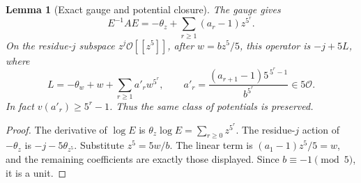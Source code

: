 \documentclass[11pt]{article}
\newtheorem{lemma}{Lemma}
\newcommand{\OO}{\mathcal O}
\begin{document}
\begin{lemma}[Exact gauge and potential closure]\label{lem:quintic-ah-gauge}
The gauge gives
\[
 E^{-1}AE=-\theta_z+\sum_{r\ge1}(a_r-1)z^{5^r}.
\]
On the residue-$j$ subspace $z^j\OO[[z^5]]$, after $w=bz^5/5$,
this operator is $-j+5L$, where
\[
 L=-\theta_w+w+\sum_{r\ge1}a'_rw^{5^r},\qquad
 a'_r=\frac{(a_{r+1}-1)5^{\,5^r-1}}{b^{5^r}}\in5\OO .
\]
In fact $v(a'_r)\ge 5^r-1$.  Thus the same class of potentials
is preserved.
\end{lemma}
\begin{proof}
The derivative of $\log E$ is
$\theta_z\log E=\sum_{r\ge0}z^{5^r}$.
The residue-$j$ action of $-\theta_z$ is
$-j-5\theta_{z^5}$.  Substitute $z^5=5w/b$.
The linear term is $(a_1-1)z^5/5=w$, and the remaining
coefficients are exactly those displayed.  Since $b\equiv-1\pmod5$,
it is a unit.
\end{proof}
\end{document}
